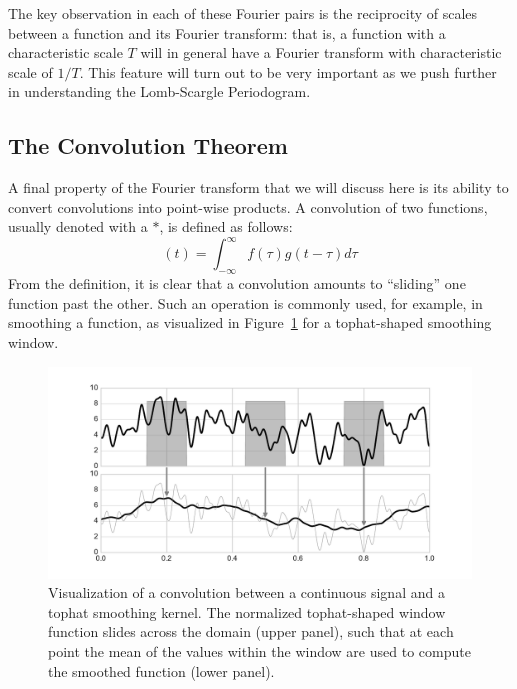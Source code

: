 \documentclass[preprint]{aastex}
\newcommand{\Fig}[1]{Figure~\ref{fig:#1}}
\newcommand{\figlabel}[1]{\label{fig:#1}}
\newcommand{\eqlabel}[1]{\label{eq:#1}}
\begin{document}
The key observation in each of these Fourier pairs is the reciprocity
of scales between a function and its Fourier transform:
that is, a function with a characteristic scale $T$ will in general
have a Fourier transform with characteristic scale of $1/T$.
This feature will turn out to be very important as we push further in
understanding the Lomb-Scargle Periodogram.


\subsection{The Convolution Theorem}

A final property of the Fourier transform that we will discuss here is its
ability to convert convolutions into point-wise products.
A convolution of two functions, usually denoted with a $\ast$, is defined
as follows:
\begin{equation}
  [f \ast g](t) = \int_{-\infty}^\infty f(\tau)g(t - \tau) d\tau
  \eqlabel{convolution-definition}
\end{equation}
From the definition, it is clear that a convolution amounts to ``sliding'' one
function past the other.
Such an operation is commonly used, for example, in smoothing a function,
as visualized in \Fig{convolution} for a tophat-shaped smoothing window.

\begin{figure}[ht]
  \centering
  \includegraphics[width=\textwidth]{fig04_Convolution_Diagram}
  \caption{Visualization of a convolution between a continuous signal and a tophat smoothing kernel.
    The normalized tophat-shaped window function slides across the domain (upper panel),
    such that at each point the mean of the values within the window are
    used to compute the smoothed function (lower panel).
    \figlabel{convolution}}
\end{figure}
\end{document}
